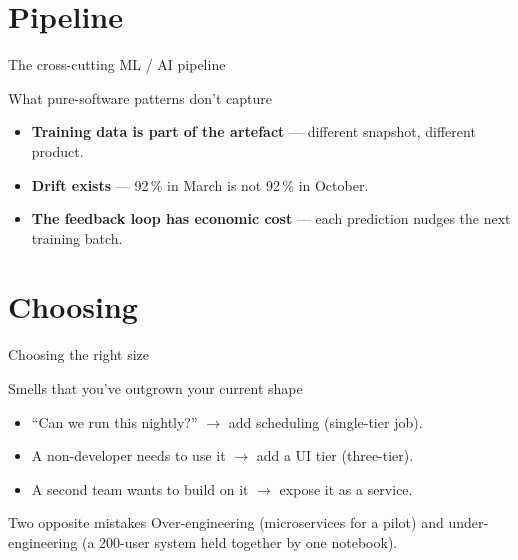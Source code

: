 \documentclass[aspectratio=169,11pt]{beamer}
\begin{document}
\section{Pipeline}
\begin{frame}{The cross-cutting ML / AI pipeline}
  \begin{center}
  \end{center}
  \begin{block}{What pure-software patterns don't capture}
    \begin{itemize}
      \item \textbf{Training data is part of the artefact} --- different snapshot, different product.
      \item \textbf{Drift exists} --- 92\,\% in March is not 92\,\% in October.
      \item \textbf{The feedback loop has economic cost} --- each prediction nudges the next training batch.
    \end{itemize}
  \end{block}
\end{frame}

\section{Choosing}
\begin{frame}{Choosing the right size}
  \begin{block}{Smells that you've outgrown your current shape}
    \begin{itemize}
      \item ``Can we run this nightly?'' $\to$ add scheduling (single-tier job).
      \item A non-developer needs to use it $\to$ add a UI tier (three-tier).
      \item A second team wants to build on it $\to$ expose it as a service.
    \end{itemize}
  \end{block}
  \begin{exampleblock}{Two opposite mistakes}
    \textcolor{cred}{Over-engineering} (microservices for a pilot) and \textcolor{cred}{under-engineering} (a 200-user system held together by one notebook).
  \end{exampleblock}
\end{frame}
\end{document}

